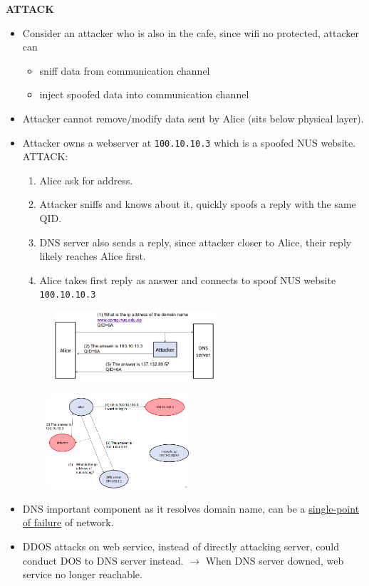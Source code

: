 \documentclass[10pt,landscape]{article}
\begin{document}
\begin{multicols*}{3}
\textbf{ATTACK}
\begin{itemize}[noitemsep,wide=0pt, leftmargin=\dimexpr{} + 2\relax]
    \item Consider an attacker who is also in the cafe, since wifi no protected, attacker can
    \begin{itemize}[noitemsep,wide=0pt, leftmargin=\dimexpr{} + 2\relax]
        \item sniff data from communication channel
        \item inject spoofed data into communication channel
    \end{itemize}
    \item Attacker cannot remove/modify data sent by Alice (sits below physical layer).
    \item Attacker owns a webserver at \verb|100.10.10.3| which is a spoofed NUS website. ATTACK:
    \begin{enumerate}[noitemsep,wide=0pt, leftmargin=\dimexpr\labelwidth + 2\labelsep\relax]
        \item Alice ask for address.
        \item Attacker sniffs and knows about it, quickly spoofs a reply with the same QID.
        \item DNS server also sends a reply, since attacker closer to Alice, their reply likely reaches Alice first.
        \item Alice takes first reply as answer and connects to spoof NUS website \verb|100.10.10.3|
    \end{enumerate}
    \includegraphics*[width=8.3cm, height=2.6cm]{images/dnspoisoning.png}
\end{itemize}

\includegraphics*[width=8.3cm, height=3.5cm]{images/dnsspoofing.png}
\begin{itemize}[noitemsep,wide=0pt, leftmargin=\dimexpr{} + 2\relax]
    \item DNS important component as it resolves domain name, can be a \underline{single-point of failure} of network.
    \item DDOS attacks on web service, instead of directly attacking server, could conduct DOS to DNS server instead. $\rightarrow$
    When DNS server downed, web service no longer reachable.
\end{itemize}


\end{multicols*}
\end{document}
